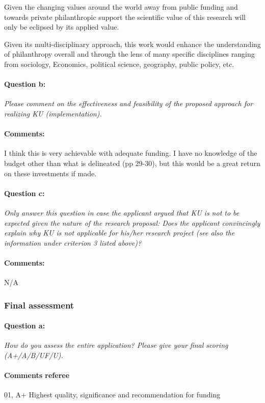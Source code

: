\documentclass[twocolumn, serif, rga, numeric]{jote-article}
\begin{document}
Given the changing values around the world away from public funding and towards private philanthropic support the scientific value of this research will only be eclipsed by its applied value.

Given its multi-disciplinary approach, this work would enhance the understanding of philanthropy overall and through the lens of many specific disciplines ranging from sociology, Economics, political science, geography, public policy, etc.
\paragraph{Question b:}
\textit{Please comment on the effectiveness and feasibility of the proposed approach for realizing KU (implementation).}
\paragraph{Comments:}
I think this is very achievable with adequate funding. I have no knowledge of the budget other than what is delineated (pp 29-30), but this would be a great return on these investments if made.
\paragraph{Question c:}
\textit{Only answer this question in case the applicant argued that KU is not to be expected given the nature of the research proposal: Does the applicant convincingly explain why KU is not applicable for his/her research project (see also the information under criterion 3 listed above)?}
\paragraph{Comments:}
N/A
 {}\subsubsection*{Final assessment} 
\paragraph{Question a:}
\textit{How do you assess the entire application? Please give your final scoring (A+/A/B/UF/U).}
\paragraph{Comments referee}
01, A+ Highest quality, significance and recommendation for funding
\end{document}
